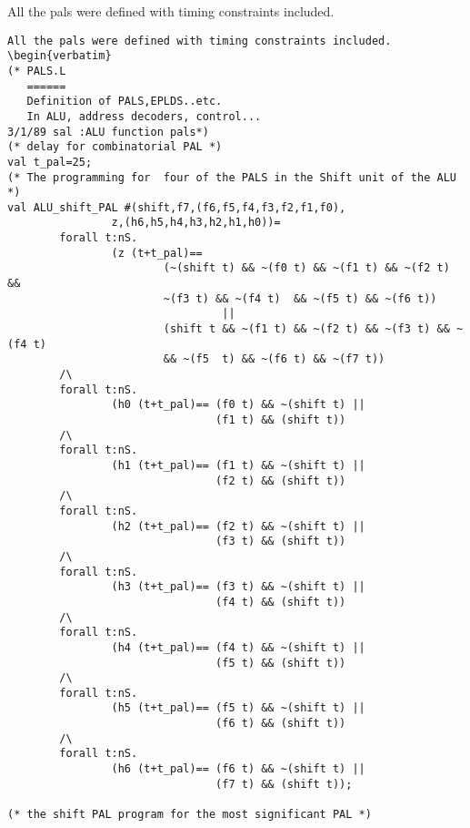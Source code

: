 All the pals were defined with timing constraints included.
\begin{verbatim}All the pals were defined with timing constraints included.
\begin{verbatim}
(* PALS.L
   ======
   Definition of PALS,EPLDS..etc.
   In ALU, address decoders, control...
3/1/89 sal :ALU function pals*)
(* delay for combinatorial PAL *)
val t_pal=25;
(* The programming for  four of the PALS in the Shift unit of the ALU *)
val ALU_shift_PAL #(shift,f7,(f6,f5,f4,f3,f2,f1,f0),
                z,(h6,h5,h4,h3,h2,h1,h0))=
        forall t:nS.
                (z (t+t_pal)==
                        (~(shift t) && ~(f0 t) && ~(f1 t) && ~(f2 t) &&
                        ~(f3 t) && ~(f4 t)  && ~(f5 t) && ~(f6 t))
                                 ||
                        (shift t && ~(f1 t) && ~(f2 t) && ~(f3 t) && ~(f4 t) 
                        && ~(f5  t) && ~(f6 t) && ~(f7 t)) 
        /\
        forall t:nS.
                (h0 (t+t_pal)== (f0 t) && ~(shift t) ||
                                (f1 t) && (shift t))
        /\
        forall t:nS.
                (h1 (t+t_pal)== (f1 t) && ~(shift t) ||
                                (f2 t) && (shift t))
        /\
        forall t:nS.
                (h2 (t+t_pal)== (f2 t) && ~(shift t) ||
                                (f3 t) && (shift t))
        /\
        forall t:nS.
                (h3 (t+t_pal)== (f3 t) && ~(shift t) ||
                                (f4 t) && (shift t))
        /\
        forall t:nS.
                (h4 (t+t_pal)== (f4 t) && ~(shift t) ||
                                (f5 t) && (shift t))
        /\
        forall t:nS.
                (h5 (t+t_pal)== (f5 t) && ~(shift t) ||
                                (f6 t) && (shift t))
        /\
        forall t:nS.
                (h6 (t+t_pal)== (f6 t) && ~(shift t) ||
                                (f7 t) && (shift t));

(* the shift PAL program for the most significant PAL *)


\end{verbatim}
